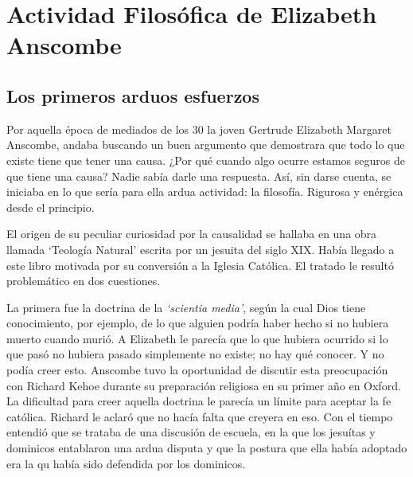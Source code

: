 \section{Actividad Filosófica de Elizabeth Anscombe}

\subsection{Los primeros arduos esfuerzos}


Por aquella época de mediados de los 30 la joven Gertrude Elizabeth Margaret
Anscombe, andaba buscando un buen argumento que demostrara que todo lo que
existe tiene que tener una causa. ¿Por qué cuando algo ocurre estamos seguros de
que tiene una causa? Nadie sabía darle una respuesta.\autocite[cf.~][p.~vii
]{anscombe1981metaphysicsintro} Así, sin darse cuenta, se iniciaba en lo que
sería para ella ardua actividad: la filosofía. Rigurosa y enérgica desde el
principio.

El origen de su peculiar curiosidad por la causalidad se hallaba en una obra
llamada `Teología Natural' escrita por un jesuita del siglo XIX. Había llegado a
este libro motivada por su conversión a la Iglesia
Católica.\autocite[cf.~][p.~vii]{anscombe1981metaphysicsintro} El tratado le
resultó problemático en dos cuestiones.

La primera fue la doctrina de la \emph{`scientia media'}, según la cual Dios
tiene conocimiento, por ejemplo, de lo que alguien podría haber hecho si no
hubiera muerto cuando murió. A Elizabeth le parecía que lo que hubiera ocurrido
si lo que pasó no hubiera pasado simplemente no existe; no hay qué conocer. Y no
podía creer esto. Anscombe tuvo la oportunidad de discutir esta preocupación con
Richard Kehoe durante su preparación religiosa en su primer año en Oxford. La
dificultad para creer aquella doctrina le parecía un límite para aceptar la fe
católica. Richard le aclaró que no hacía falta que creyera en eso. Con el tiempo
entendió que se trataba de una discusión de escuela, en la que los jesuítas y
dominicos entablaron una ardua disputa y que la postura que ella había adoptado
era la qu había sido defendida por los
dominicos.\autocite[cf.~][p.~vii]{anscombe1981metaphysicsintro}

